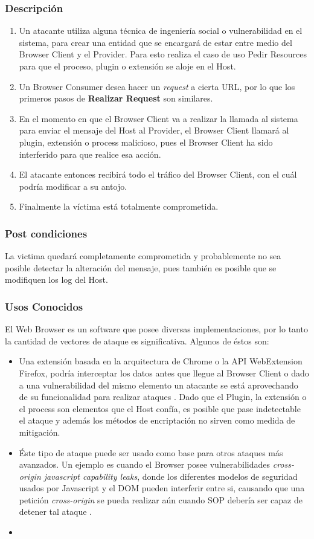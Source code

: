 	\subsubsection{Descripción}
			\begin{enumerate}
				\item Un atacante utiliza alguna técnica de ingeniería social o vulnerabilidad en el sistema, para crear una entidad que se encargará de estar entre medio del Browser Client y el Provider. Para esto realiza el caso de uso Pedir Resources para que el proceso, plugin o extensión se aloje en el Host.
				\item Un Browser Consumer desea hacer un \textit{request} a cierta URL, por lo que los primeros pasos de \textbf{Realizar Request} son similares.
				\item En el momento en que el Browser Client va a realizar la llamada al sistema para enviar el mensaje del Host al Provider, el Browser Client llamará al plugin, extensión o process malicioso, pues el Browser Client ha sido interferido para que realice esa acción.
				\item El atacante entonces recibirá todo el tráfico del Browser Client, con el cuál podría modificar a su antojo.
				\item Finalmente la víctima está totalmente comprometida.
			\end{enumerate}
	\subsubsection{Post condiciones} La victima quedará completamente comprometida y probablemente no sea posible detectar la alteración del mensaje, pues también es posible que se modifiquen los log del Host.
	\subsubsection{Usos Conocidos} El Web Browser es un software que posee diversas implementaciones, por lo tanto la cantidad de vectores de ataque es significativa. Algunos de éstos son:
			\begin{itemize}
				\item  Una extensión basada en la arquitectura de Chrome o la API WebExtension Firefox, podría interceptar los datos antes que llegue al Browser Client \cite{Paola2006} o dado a una vulnerabilidad del mismo elemento un atacante se está aprovechando de su funcionalidad para realizar ataques \cite{Liu2012, Barth2010}. Dado que el Plugin, la extensión o el process son elementos que el Host confía, es posible que pase indetectable el ataque y además los métodos de encriptación no sirven como medida de mitigación.
				\item Éste tipo de ataque puede ser usado como base para otros ataques más avanzados. Un ejemplo es cuando el Browser posee vulnerabilidades \textit{cross-origin javascript capability leaks}, donde los diferentes modelos de seguridad usados por Javascript y el DOM pueden interferir entre si, causando que una petición \textit{cross-origin} se pueda realizar aún cuando SOP debería ser capaz de detener tal ataque \cite{Barth2009}.
				\item 
			\end{itemize}


